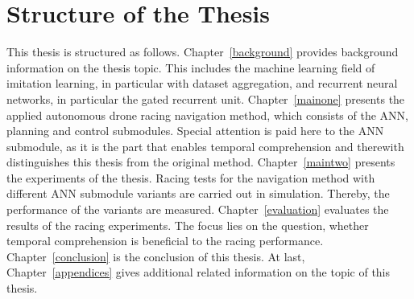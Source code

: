\section{Structure of the Thesis}




This thesis is structured as follows. 
Chapter~\ref{background}
provides background information on the thesis topic.
This includes the machine learning field of 
imitation learning, in particular with dataset aggregation,
and recurrent neural networks, in particular the gated recurrent unit.
Chapter~\ref{mainone} presents 
the applied autonomous drone racing navigation method,
which consists of the ANN, planning and control submodules.
Special attention is paid here to the ANN submodule,
as it is the part that enables temporal comprehension
and therewith distinguishes this thesis from the original method.
Chapter~\ref{maintwo} presents the 
experiments of the thesis.
Racing tests for the navigation method 
with different ANN submodule variants are carried out in simulation.
Thereby, the performance of the variants are measured.
Chapter~\ref{evaluation} evaluates 
the results of the racing experiments.
The focus lies on the question,
whether temporal comprehension is beneficial to the racing performance.
Chapter~\ref{conclusion} is the conclusion of this thesis. 
At last, Chapter~\ref{appendices} gives additional related information 
on the topic of this thesis.